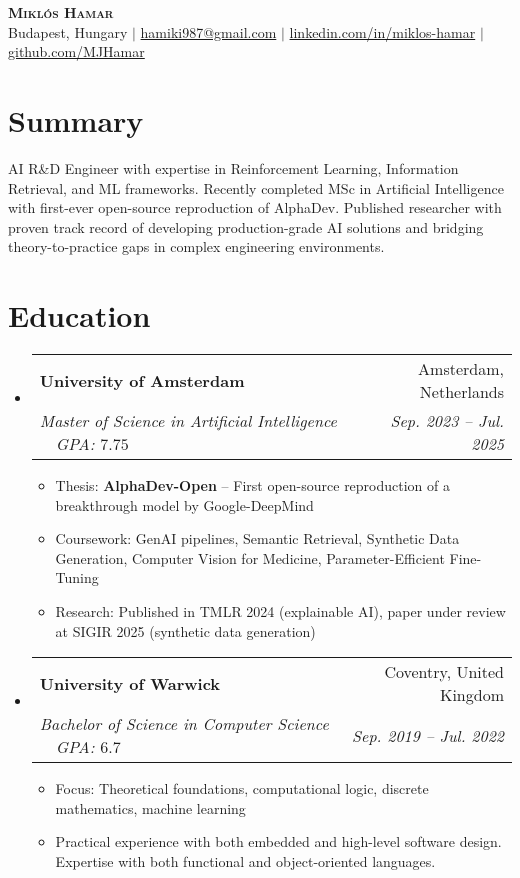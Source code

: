\documentclass[letterpaper,11pt]{article}
\makeatletter
\newcommand{\resumeItem}[1]{
  \item\small{
    {#1 \vspace{-2pt}}
  }
}
\newcommand{\resumeSubheading}[4]{
  \vspace{-2pt}\item
    \begin{tabular*}{0.97\textwidth}[t]{l@{\extracolsep{\fill}}r}
      \textbf{#1} & #2 \\
      \textit{\small#3} & \textit{\small #4} \\
    \end{tabular*}\vspace{-7pt}
}
\newcommand{\resumeSubHeadingListStart}{\begin{itemize}[leftmargin=0.15in, label={}]}
\newcommand{\resumeSubHeadingListEnd}{\end{itemize}}
\newcommand{\resumeItemListStart}{\begin{itemize}}
\newcommand{\resumeItemListEnd}{\end{itemize}\vspace{-5pt}}
\makeatother
\begin{document}
\begin{center}
    \textbf{\Huge \scshape Miklós Hamar} \\ \vspace{1pt}
    \small Budapest, Hungary $|$ \underline{hamiki987@gmail.com} $|$ 
    \underline{linkedin.com/in/miklos-hamar} $|$
    \underline{github.com/MJHamar}
\end{center}


\section{Summary}
\small{AI R\&D Engineer with expertise in Reinforcement Learning, Information Retrieval, and ML frameworks. Recently completed MSc in Artificial Intelligence with first-ever open-source reproduction of AlphaDev. Published researcher with proven track record of developing production-grade AI solutions and bridging theory-to-practice gaps in complex engineering environments.}


\section{Education}
  \resumeSubHeadingListStart
    \resumeSubheading
      {University of Amsterdam}{Amsterdam, Netherlands}
      {Master of Science in Artificial Intelligence$\quad$GPA: $7.75$}{Sep. 2023 -- Jul. 2025}
      \resumeItemListStart
        \resumeItem{Thesis: \textbf{AlphaDev-Open} -- First open-source reproduction of a breakthrough model by Google-DeepMind}
        \resumeItem{Coursework: GenAI pipelines, Semantic Retrieval, Synthetic Data Generation, Computer Vision for Medicine, Parameter-Efficient Fine-Tuning}
        \resumeItem{Research: Published in TMLR 2024 (explainable AI), paper under review at SIGIR 2025 (synthetic data generation)}
      \resumeItemListEnd
      
    \resumeSubheading
      {University of Warwick}{Coventry, United Kingdom}
      {Bachelor of Science in Computer Science$\quad$GPA: $6.7$}{Sep. 2019 -- Jul. 2022}
      \resumeItemListStart
        \resumeItem{Focus: Theoretical foundations, computational logic, discrete mathematics, machine learning}
        \resumeItem{Practical experience with both embedded and high-level software design. Expertise with both functional and object-oriented languages.}
      \resumeItemListEnd
  \resumeSubHeadingListEnd


\end{document}
